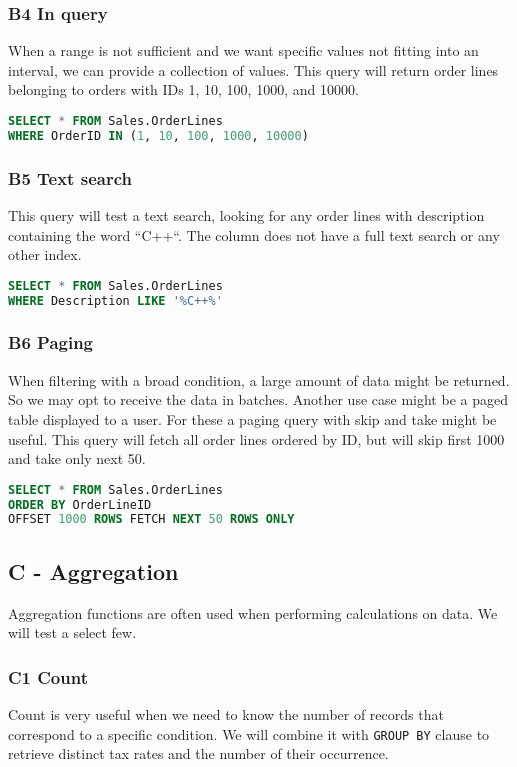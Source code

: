 \subsubsection*{B4 In query}
When a range is not sufficient and we want specific values not fitting into an interval, we can provide a collection of values.
This query will return order lines belonging to orders with IDs 1, 10, 100, 1000, and 10000.

\begin{lstlisting}[language=SQL]
SELECT * FROM Sales.OrderLines 
WHERE OrderID IN (1, 10, 100, 1000, 10000)
\end{lstlisting}

\subsubsection*{B5 Text search}
This query will test a text search, looking for any order lines with description containing the word ``C++``.  The column does not have a full text search or any other index.

\begin{lstlisting}[language=SQL]
SELECT * FROM Sales.OrderLines 
WHERE Description LIKE '%C++%'
\end{lstlisting}

\subsubsection*{B6 Paging}
When filtering with a broad condition, a large amount of data might be returned. So we may opt to receive the data in batches. Another use case might be a paged table displayed to a user. For these a paging query with skip and take might be useful.
This query will fetch all order lines ordered by ID, but will skip first 1000 and take only next 50.

\begin{lstlisting}[language=SQL]
SELECT * FROM Sales.OrderLines 
ORDER BY OrderLineID 
OFFSET 1000 ROWS FETCH NEXT 50 ROWS ONLY
\end{lstlisting}

\subsection{C - Aggregation}
Aggregation functions are often used when performing calculations on data. We will test a select few.

\subsubsection*{C1 Count}
Count is very useful when we need to know the number of records that correspond to a specific condition. We will combine it with \texttt{GROUP BY} clause to retrieve distinct tax rates and the number of their occurrence.

